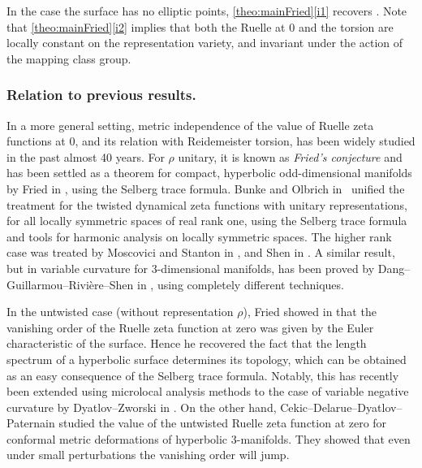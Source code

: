 \documentclass[10pt]{amsart}
\theoremstyle{plain}
\theoremstyle{definition}
\theoremstyle{remark}
\numberwithin{equation}{section}
\begin{document}
In the case the surface has no elliptic points, \cref{theo:mainFried}\eqref{i1} recovers \cite[Cor.\,C]{FS}. Note that \cref{theo:mainFried}\eqref{i2} implies that both the Ruelle at $0$ and the torsion are
locally constant on the representation variety, and invariant under the action of the mapping class group.

\subsubsection*{Relation to previous results.}
In a more general setting, metric independence of the value of Ruelle zeta functions at $0$, and its relation with Reidemeister torsion, has been widely studied in the past almost 40 years. For $\rho$ unitary, it is known as \textit{Fried's conjecture} and has been settled as a theorem for compact, hyperbolic odd-dimensional manifolds by Fried in \cite{Fried86}, using the Selberg trace formula. Bunke and Olbrich in~\cite{BO} unified the treatment for the twisted dynamical zeta functions with unitary representations, for all locally symmetric spaces of real rank one, using the Selberg trace formula and tools for harmonic analysis on locally symmetric spaces. The higher rank case was treated by Moscovici and Stanton in \cite{Moscovici_Stanton}, and Shen in \cite{Shen18}. A similar result, but in variable curvature for $3$-dimensional manifolds, has been proved by Dang--Guillarmou--Rivière--Shen in \cite{dang2019fried}, using completely different techniques.

In the untwisted case (without representation $\rho$), Fried showed in \cite{fried1986fuchsian} that the vanishing order of the Ruelle zeta function at zero was given by the Euler characteristic of the surface. Hence he recovered the fact that the length spectrum of a hyperbolic surface determines its topology, which can be obtained as an easy consequence of the Selberg trace formula. Notably, this has recently been extended using microlocal analysis methods to the case of variable negative curvature by Dyatlov--Zworski in \cite{dyatlov2017ruelle}. On the other hand, Cekic--Delarue--Dyatlov--Paternain \cite{CDDP22} studied the value of the untwisted Ruelle zeta function at zero for conformal metric deformations of hyperbolic 3\nobreakdash-manifolds. They showed that even under small perturbations the vanishing order will jump.
\end{document}
